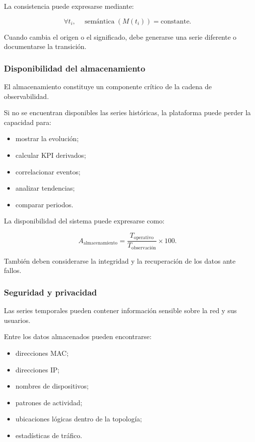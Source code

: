 La consistencia puede expresarse mediante:

\[
    \forall t_i,
    \quad
    \operatorname{semántica}
    \left(
        M(t_i)
    \right)
    =
    \text{constante}.
\]

Cuando cambia el origen o el significado, debe generarse una serie
diferente o documentarse la transición.


\subsubsection*{Disponibilidad del almacenamiento}

El almacenamiento constituye un componente crítico de la cadena de
observabilidad.

Si no se encuentran disponibles las series históricas, la plataforma
puede perder la capacidad para:

\begin{itemize}
    \item mostrar la evolución;

    \item calcular KPI derivados;

    \item correlacionar eventos;

    \item analizar tendencias;

    \item comparar periodos.
\end{itemize}

La disponibilidad del sistema puede expresarse como:

\[
    A_{\mathrm{almacenamiento}}
    =
    \frac{
        T_{\mathrm{operativo}}
    }{
        T_{\mathrm{observación}}
    }
    \times
    100.
\]

También deben considerarse la integridad y la recuperación de los datos
ante fallos.


\subsubsection*{Seguridad y privacidad}

Las series temporales pueden contener información sensible sobre la red y
sus usuarios.

Entre los datos almacenados pueden encontrarse:

\begin{itemize}
    \item direcciones MAC;

    \item direcciones IP;

    \item nombres de dispositivos;

    \item patrones de actividad;

    \item ubicaciones lógicas dentro de la topología;

    \item estadísticas de tráfico.
\end{itemize}

